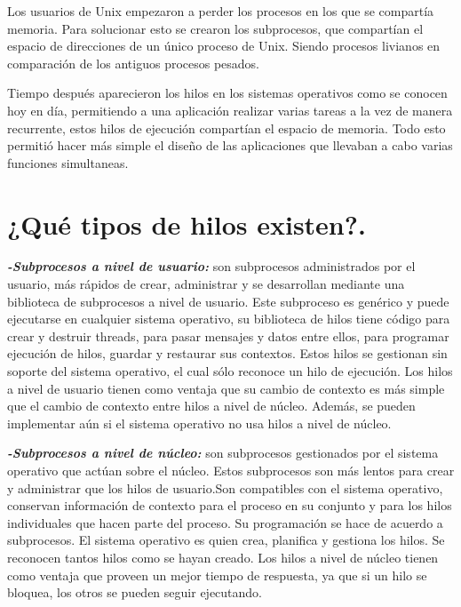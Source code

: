 \documentclass{article}
\begin{document}
Los usuarios de Unix empezaron a perder los procesos en los que se compartía memoria. Para solucionar esto se crearon los subprocesos, que compartían el espacio de direcciones de un único proceso de Unix. Siendo procesos livianos en comparación de los antiguos procesos pesados. \cite{Butenhof2008}

Tiempo después aparecieron los hilos en los sistemas operativos como se conocen hoy en día, permitiendo a una aplicación realizar varias tareas a la vez de manera recurrente, estos hilos de ejecución compartían el espacio de memoria.  Todo esto permitió hacer más simple el diseño de las aplicaciones que llevaban a cabo varias funciones simultaneas.


\section{¿Qué tipos de hilos existen?.} \cite{Birrell1986}

\textbf{\textit{-Subprocesos a nivel de usuario:}}  son subprocesos administrados por el usuario, más rápidos de crear, administrar y se desarrollan mediante una biblioteca de subprocesos a nivel de usuario. 
Este subproceso es genérico y puede ejecutarse en cualquier sistema operativo, su biblioteca de hilos tiene código para crear y destruir threads, para pasar mensajes y datos entre ellos, para programar ejecución de hilos, guardar y restaurar sus contextos. Estos hilos se gestionan sin soporte del sistema operativo, el cual sólo reconoce un hilo de ejecución.
Los hilos a nivel de usuario tienen como ventaja que su cambio de contexto es más simple que el cambio de contexto entre hilos a nivel de núcleo. Además, se pueden implementar aún si el sistema operativo no usa hilos a nivel de núcleo. 

\textbf{\textit{-Subprocesos a nivel de núcleo:}} son subprocesos gestionados por el sistema operativo que actúan sobre el núcleo. Estos subprocesos son más lentos para crear y administrar que los hilos de usuario.Son compatibles con el sistema operativo, conservan información de contexto para el proceso en su conjunto y para los hilos individuales que hacen parte del proceso. Su programación se hace de acuerdo a subprocesos. El sistema operativo es quien crea, planifica y gestiona los hilos. Se reconocen tantos hilos como se hayan creado.
Los hilos a nivel de núcleo tienen como ventaja que proveen un mejor tiempo de respuesta, ya que si un hilo se bloquea, los otros se pueden seguir ejecutando.\cite{Ieee2020}
\end{document}
